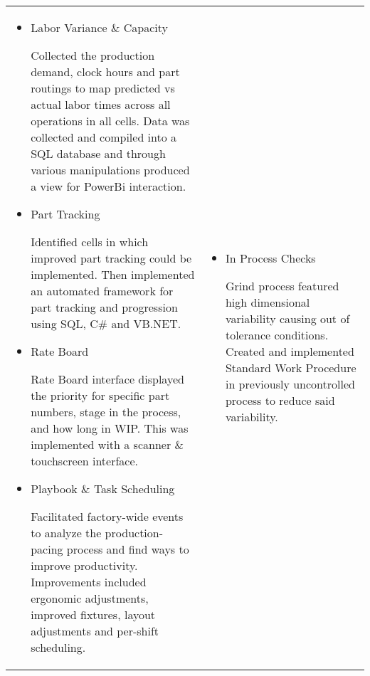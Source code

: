 \documentclass[a4paper, oneside, final, 10pt]{scrartcl} %
\newcommand{\Csharp}{C{\lserif\#}}
\begin{document}
\begin{center}
\vspace{-10pt}
\begin{tabularx}{0.97\linewidth}{X|X}
    \vspace{-10pt}
    \begin{itemize}\setlength\itemsep{0em}
        \item{Labor Variance \&{} Capacity}
        \begin{sloppypar}
            Collected the production demand, clock hours and part routings to map predicted vs actual labor times across all operations in all cells.
            Data was collected and compiled into a SQL database and through various manipulations produced a view for PowerBi interaction.
        \end{sloppypar}
        \item{Part Tracking}
        \begin{sloppypar}
            Identified cells in which improved part tracking could be implemented.
            Then implemented an automated framework for part tracking and progression using SQL, \Csharp{} and VB.NET.
        \end{sloppypar}
        \item {Rate Board}
        \begin{sloppypar}
            Rate Board interface displayed the priority for specific part numbers, stage in the process, and how long in WIP. \@{}
            This was implemented with a scanner \& touchscreen interface.
        \end{sloppypar}
        \item{Playbook \&{} Task Scheduling}
        \begin{sloppypar}
            Facilitated factory-wide events to analyze the production-pacing process and find ways to improve productivity.
            Improvements included ergonomic adjustments, improved fixtures, layout adjustments and per-shift scheduling.
        \end{sloppypar}
    \end{itemize} & \vspace{-10pt} \begin{itemize}\setlength\itemsep{0em}
        \item{In Process Checks}
        \begin{sloppypar}
            Grind process featured high dimensional variability causing out of tolerance conditions.
            Created and implemented Standard Work Procedure in previously uncontrolled process to reduce said variability.
        \end{sloppypar}

\end{itemize}
\end{tabularx}
\end{center}
\end{document}
